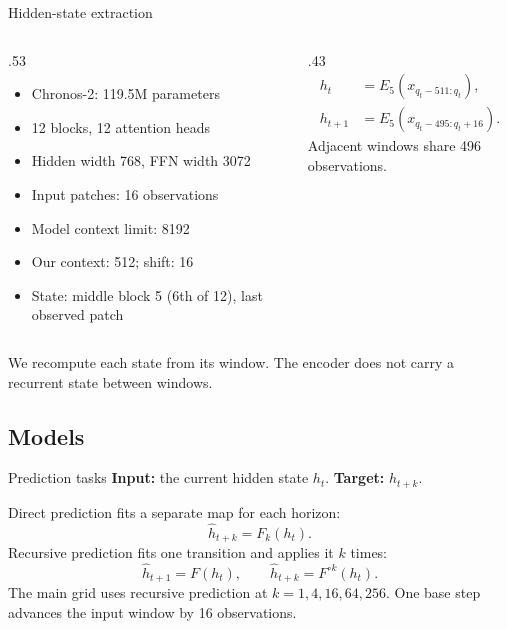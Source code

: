 \documentclass[aspectratio=169,11pt]{beamer}
\begin{document}
\begin{frame}{Hidden-state extraction}
\begin{columns}[T,onlytextwidth]
\begin{column}{.53\textwidth}
\begin{itemize}
\item Chronos-2: 119.5M parameters
\item 12 blocks, 12 attention heads
\item Hidden width 768, FFN width 3072
\item Input patches: 16 observations
\item Model context limit: 8192
\item Our context: 512; shift: 16
\item State: middle block 5 (6th of 12), last observed patch
\end{itemize}
\end{column}
\begin{column}{.43\textwidth}
\[
\begin{aligned}
h_t&=E_5(x_{q_t-511:q_t}),\\[2mm]
h_{t+1}&=E_5(x_{q_t-495:q_t+16}).
\end{aligned}
\]
Adjacent windows share 496 observations.
\end{column}
\end{columns}
\vspace{5mm}
We recompute each state from its window. The encoder does not carry a recurrent state between windows.
\end{frame}

\subsection{Models}
\begin{frame}{Prediction tasks}
\textbf{Input:} the current hidden state $h_t$. \textbf{Target:} $h_{t+k}$.
\vspace{2mm}

Direct prediction fits a separate map for each horizon:
\[
 \widehat h_{t+k}=F_k(h_t).
\]
Recursive prediction fits one transition and applies it $k$ times:
\[
 \widehat h_{t+1}=F(h_t),\qquad \widehat h_{t+k}=F^{\circ k}(h_t).
\]
The main grid uses recursive prediction at $k=1,4,16,64,256$.
One base step advances the input window by 16 observations.
\end{frame}
\end{document}
